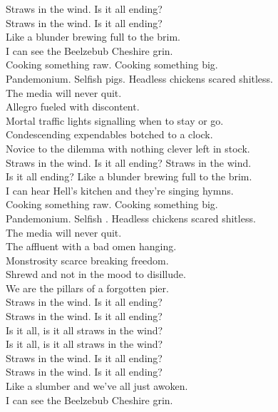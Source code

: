 Straws in the wind. Is it all ending? \\
Straws in the wind. Is it all ending? \\
Like a blunder brewing full to the brim. \\
I can see the Beelzebub Cheshire grin. \\

Cooking something raw. Cooking something big. \\
Pandemonium. Selfish pigs. Headless chickens scared shitless. \\
The media will never quit. \\

Allegro fueled with discontent. \\
Mortal traffic lights signalling when to stay or go. \\
Condescending expendables botched to a clock. \\
Novice to the dilemma with nothing clever left in stock. \\

Straws in the wind. Is it all ending? Straws in the wind. \\
Is it all ending? Like a blunder brewing full to the brim. \\
I can hear Hell's kitchen and they're singing hymns. \\

Cooking something raw. Cooking something big. \\
Pandemonium. Selfish . Headless chickens scared shitless. \\
The media will never quit. \\

The affluent with a bad omen hanging. \\
Monstrosity scarce breaking freedom. \\
Shrewd and not in the mood to disillude. \\
We are the pillars of a forgotten pier. \\

Straws in the wind. Is it all ending? \\
Straws in the wind. Is it all ending? \\
Is it all, is it all straws in the wind? \\
Is it all, is it all straws in the wind? \\

Straws in the wind. Is it all ending? \\
Straws in the wind. Is it all ending? \\
Like a slumber and we've all just awoken. \\
I can see the Beelzebub Cheshire grin. \\

